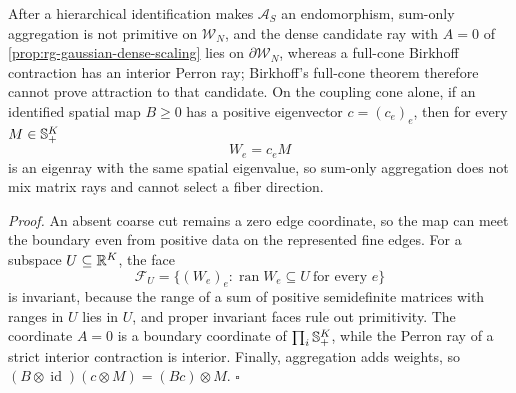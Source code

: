 After a hierarchical identification makes \(\mathcal A_S\) an endomorphism,
sum-only aggregation is not primitive on \(\mathcal W_N\), and the dense
candidate ray with \(A=0\) of \cref{prop:rg-gaussian-dense-scaling} lies on
\(\partial\mathcal W_N\), whereas a full-cone Birkhoff contraction has an
interior Perron ray; Birkhoff's full-cone theorem therefore cannot prove
attraction to that candidate. On the coupling cone alone, if an identified
spatial map \(B\geq0\) has a positive eigenvector \(c=(c_e)_e\), then for every
\(M\in\mathbb S_{+}^K\)
\begin{equation}
W_e=c_eM
\label{eq:grg-inert-fiber}
\end{equation}
is an eigenray with the same spatial eigenvalue, so sum-only aggregation does
not mix matrix rays and cannot select a fiber direction. 

\noindent\emph{Proof.}
An absent coarse cut remains a zero edge coordinate, so the map can meet the
boundary even from positive data on the represented fine edges. For a subspace
\(U\subseteq\mathbb R^K\), the face
\begin{equation}
\mathcal F_U=\{(W_e)_e:\operatorname{ran}W_e\subseteq U\ \text{for every }e\}
\label{eq:grg-common-range-face}
\end{equation}
is invariant, because the range of a sum of positive semidefinite matrices
with ranges in \(U\) lies in \(U\), and proper invariant faces rule out
primitivity. The coordinate \(A=0\) is a boundary coordinate of
\(\prod_i\mathbb S_{+}^K\), while the Perron ray of a strict interior contraction is
interior. Finally, aggregation adds weights, so
\((B\otimes\operatorname{id})(c\otimes M)=(Bc)\otimes M\). \(\square\)

